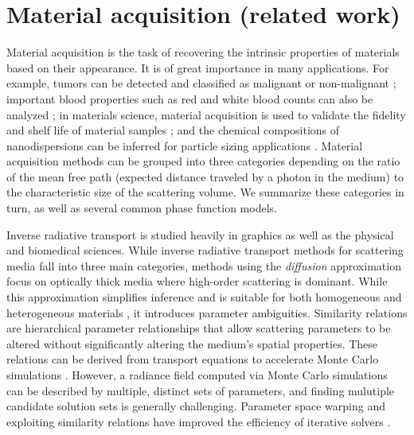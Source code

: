 \section{Material acquisition (related work)}

Material acquisition is the task of recovering the intrinsic properties of materials based on their appearance. It is of great importance in many applications. For example, tumors can be detected and classified as malignant or non-malignant \cite{boas2001imaging}; important blood properties such as red and white blood counts can also be analyzed \cite{berne2000dynamic, durduran2010diffuse}; in materials science, material acquisition is used to validate the fidelity and shelf life of material samples \cite{sumin2019geometry}; and the chemical compositions of nanodispersions can be inferred for particle sizing applications \cite{pine1990diffusing}. Material acquisition methods can be grouped into three categories depending on the ratio of the mean free path (expected distance traveled by a photon in the medium) to the characteristic size of the scattering volume. We summarize these categories in turn, as well as several common phase function models.

Inverse radiative transport \cite{bal2009inverse} is studied heavily in graphics as well as the physical and biomedical sciences. While inverse radiative transport methods for scattering media fall into three main categories, methods using the \textit{diffusion} approximation focus on optically thick media where high-order scattering is dominant. While this approximation simplifies inference and is suitable for both homogeneous and heterogeneous materials \cite{farrell1992diffusion, munoz2011bssrdf, papas2013fabricating}, it introduces parameter ambiguities. Similarity relations are hierarchical parameter relationships that allow scattering parameters to be altered without significantly altering the medium's spatial properties. These relations can be derived from transport equations to accelerate Monte Carlo simulations \cite{wyman1989similarity}. However, a radiance field computed via Monte Carlo simulations can be described by multiple, distinct sets of parameters, and finding mulutiple candidate solution sets is generally challenging. Parameter space warping and exploiting similarity relations have improved the efficiency of iterative solvers \cite{zhao2014high}.

